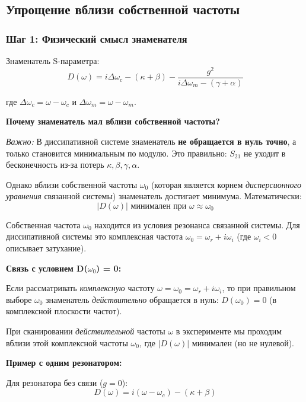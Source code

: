 \documentclass[12pt,a4paper]{article}
\begin{document}
\subsection{Упрощение вблизи собственной частоты}

\subsubsection{Шаг 1: Физический смысл знаменателя}

Знаменатель S-параметра:
\begin{equation}
D(\omega) = i\Delta\omega_c - (\kappa+\beta) - \frac{g^2}{i\Delta\omega_m - (\gamma+\alpha)}
\end{equation}

где $\Delta\omega_c = \omega - \omega_c$ и $\Delta\omega_m = \omega - \omega_m$.

\textbf{Почему знаменатель мал вблизи собственной частоты?}

\textit{Важно:} В диссипативной системе знаменатель \textbf{не обращается в нуль точно}, а только становится минимальным по модулю. Это правильно: $S_{21}$ не уходит в бесконечность из-за потерь $\kappa, \beta, \gamma, \alpha$.

Однако вблизи собственной частоты $\omega_0$ (которая является корнем \textit{дисперсионного уравнения} связанной системы) знаменатель достигает минимума. Математически:
\begin{equation}
|D(\omega)| \text{ минимален при } \omega \approx \omega_0
\end{equation}

Собственная частота $\omega_0$ находится из условия резонанса связанной системы. Для диссипативной системы это комплексная частота $\omega_0 = \omega_r + i\omega_i$ (где $\omega_i < 0$ описывает затухание).

\textbf{Связь с условием D($\omega_0$) = 0:}

Если рассматривать \textit{комплексную} частоту $\omega = \omega_0 = \omega_r + i\omega_i$, то при правильном выборе $\omega_0$ знаменатель \textit{действительно} обращается в нуль: $D(\omega_0) = 0$ (в комплексной плоскости частот).

При сканировании \textit{действительной} частоты $\omega$ в эксперименте мы проходим вблизи этой комплексной частоты $\omega_0$, где $|D(\omega)|$ минимален (но не нулевой).

\textbf{Пример с одним резонатором:}

Для резонатора без связи ($g = 0$):
\begin{equation}
D(\omega) = i(\omega - \omega_c) - (\kappa + \beta)
\end{equation}
\end{document}
